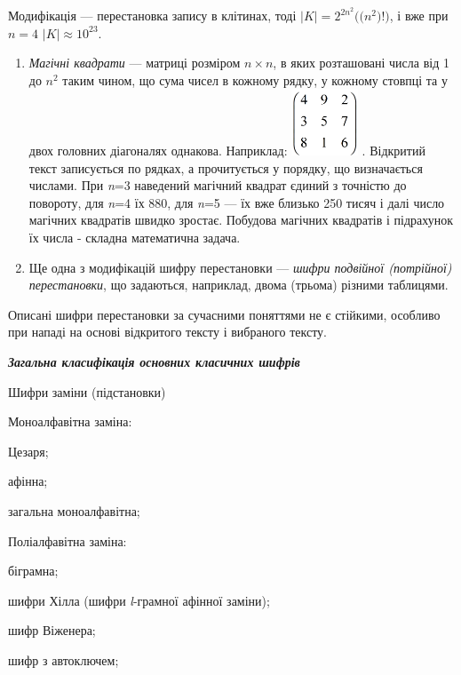 Модифікація --- перестановка запису в клітинах, тоді  
$|K|=2^{2n^{{2}}}((n^2{)!)}$,  і вже при  $n=4$   ${|K|\approx
\text{10}^{\text{23}}}$.

\liststyleWWviiiNumxli
\setcounter{saveenum}{\value{enumi}}
\begin{enumerate}
\setcounter{enumi}{\value{saveenum}}
\item \textit{Магічні квадрати} --- матриці розміром  $n\times n$, в яких
розташовані числа від 1 до  $n^2$ таким чином, що сума чисел в кожному
рядку, у кожному стовпці та у двох головних діагоналях однакова. Наприклад: 
\includegraphics[width=0.778in,height=0.778in]{crypt-img/crypt-img76.png} .
Відкритий текст записується по рядках, а прочитується у порядку, що
визначається числами. При \textit{n}=3 наведений магічний квадрат єдиний з
точністю до повороту, для \textit{n}=4  їх  880, для \textit{n}=5 --- їх вже
близько 250 тисяч і далі число магічних квадратів швидко зростає. Побудова
магічних квадратів і підрахунок їх числа - складна математична задача. 
\item Ще одна з модифікацій шифру перестановки --- \textit{шифри подвійної
(потрійної) перестановки}, що задаються, наприклад,  двома (трьома) різними
таблицями.
\end{enumerate}
 Описані шифри перестановки за сучасними поняттями  не є стійкими, особливо при
нападі на основі відкритого тексту і вибраного тексту.


\bigskip

{\centering\bfseries\itshape
Загальна класифікація основних класичних  шифрів
\par}


\bigskip

Шифри заміни (підстановки)

Моноалфавітна заміна:

Цезаря;

афінна;

загальна моноалфавітна;

Поліалфавітна заміна:

біграмна;

шифри Хілла (шифри \textit{l}{}-грамної афінної заміни);

шифр Віженера;

шифр з автоключем;

